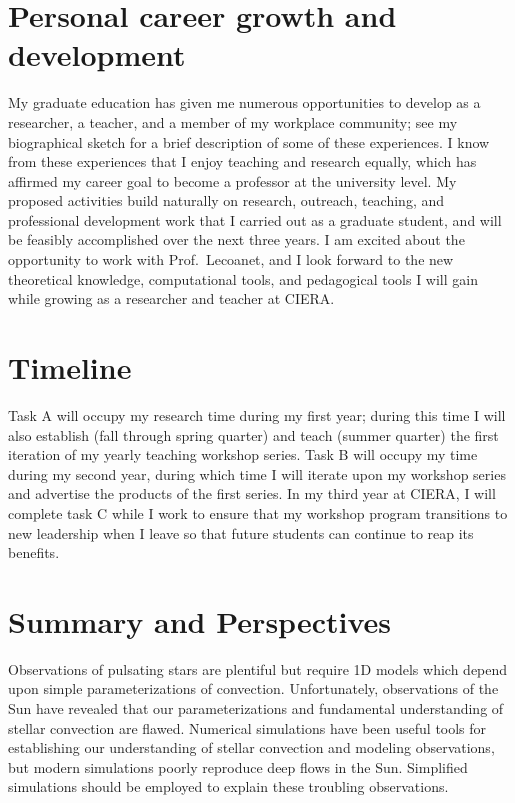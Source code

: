 \documentclass[11pt, preprint]{aastex}
\begin{document}
\section{Personal career growth and development}
\vspace{-11pt}
\label{sct:personal_growth}
My graduate education has given me numerous opportunities to develop as a researcher, a teacher, and a member of my workplace community; see my biographical sketch for a brief description of some of these experiences.
I know from these experiences that I enjoy teaching and research equally, which has affirmed my career goal to become a professor at the university level.
My proposed activities build naturally on research, outreach, teaching, and professional development work that I carried out as a graduate student, and will be feasibly accomplished over the next three years.
I am excited about the opportunity to work with Prof.~Lecoanet, and I look forward to the new theoretical knowledge, computational tools, and pedagogical tools I will gain while growing as a researcher and teacher at CIERA.

\vspace{-33pt}
\section{Timeline}
\vspace{-11pt}
Task A will occupy my research time during my first year; during this time I will also establish (fall through spring quarter) and teach (summer quarter) the first iteration of my yearly teaching workshop series.
Task B will occupy my time during my second year, during which time I will iterate upon my workshop series and advertise the products of the first series. 
In my third year at CIERA, I will complete task C while I work to ensure that my workshop program transitions to new leadership when I leave so that future students can continue to reap its benefits.

\vspace{-30pt}
\section{Summary and Perspectives}
\vspace{-11pt}
Observations of pulsating stars are plentiful but require 1D models which depend upon simple parameterizations of convection.
Unfortunately, observations of the Sun have revealed that our parameterizations and fundamental understanding of stellar convection are flawed.
Numerical simulations have been useful tools for establishing our understanding of stellar convection and modeling observations, but modern simulations poorly reproduce deep flows in the Sun.
Simplified simulations should be employed to explain these troubling observations.
\end{document}
